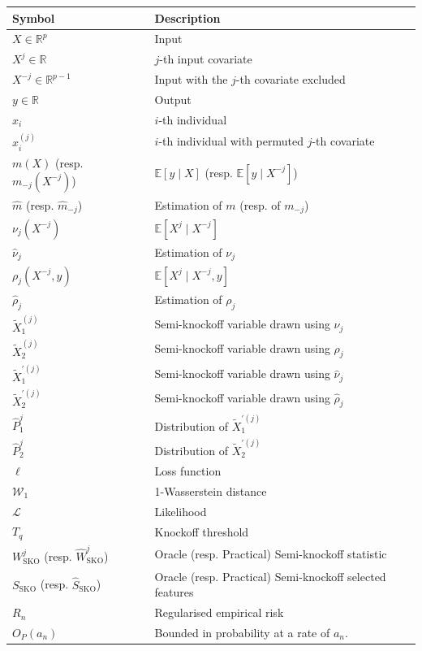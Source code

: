 \documentclass{article}
\theoremstyle{plain}
\theoremstyle{definition}
\theoremstyle{remark}
\newcommand{\e}[1]{\mathbb{E}\left[#1\right]  } %
\begin{document}
\begin{longtable}{p{4cm} p{12cm}}
\textbf{Symbol} & \textbf{Description} \\
\hline
$X\in \mathbb{R}^p$ & Input\\
$X^j\in \mathbb{R}$ & $j$-th input covariate\\
$X^{-j}\in \mathbb{R}^{p-1}$ & Input with the $j$-th covariate excluded\\
$y\in \mathbb{R}$ & Output\\
$x_i$ & $i$-th individual\\
$x_i^{(j)}$ & $i$-th individual with permuted $j$-th covariate\\
$m(X)$ (resp. $m_{-j}(X^{-j})$) & $\e{y\mid X}$ (resp. $\e{y\mid X^{-j}}$)\\
$\widehat{m}$ (resp. $\widehat{m}_{-j}$) & Estimation of $m$ (resp. of $m_{-j}$) \\
$\nu_{j}(X^{-j})$ & $\e{X^j\mid X^{-j}}$\\
$\widehat{\nu}_{j}$ & Estimation of $\nu_{j}$\\
$\rho_{j}(X^{-j}, y)$ & $\e{X^j\mid X^{-j}, y}$\\
$\widehat{\rho}_{j}$ & Estimation of $\rho_{j}$\\
$\widetilde{X}^{(j)}_1$ & Semi-knockoff variable drawn using $\nu_j$\\
$\widetilde{X}^{(j)}_2$ & Semi-knockoff variable drawn using $\rho_j$\\
$\widetilde{X}^{'(j)}_1$ & Semi-knockoff variable drawn using $\widehat{\nu}_j$\\
$\widetilde{X}^{'(j)}_2$ & Semi-knockoff variable drawn using $\widehat{\rho}_j$\\
$\hat{P}_1^j$ & Distribution of $\widetilde{X}^{'(j)}_1$\\
$\hat{P}_2^j$ & Distribution of $\widetilde{X}^{'(j)}_2$\\
$\ell$ & Loss function\\
$\mathcal{W}_1$ & 1-Wasserstein distance\\
$\mathcal{L}$ & Likelihood\\
$T_q$ & Knockoff threshold\\
$W^j_\mathrm{SKO}$ (resp. $\hat{W}^j_\mathrm{SKO}$) & Oracle (resp. Practical) Semi-knockoff statistic\\
$S_\mathrm{SKO}$ (resp. $\hat{S}_\mathrm{SKO}$) & Oracle (resp. Practical) Semi-knockoff selected features\\
$R_n$ & Regularised empirical risk\\
$O_P(a_n)$ & Bounded in probability at a rate of $a_n$. 
\end{longtable}
\end{document}
